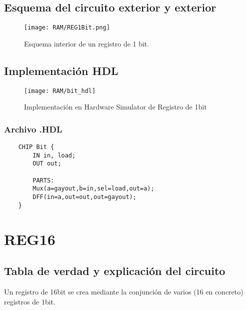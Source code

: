 \documentclass[12pt]{article}
\begin{document}
\subsection{Esquema del circuito exterior y exterior}
\begin{figure}[H]
	\centering
	\texttt{[image: RAM/REG1Bit.png]}
	\caption{Esquema interior de un registro de 1 bit.}
	\label{fig:reg1bit}
\end{figure}
\subsection{Implementación HDL}
\begin{figure}[H]
	\centering
	\texttt{[image: RAM/bit\_hdl]}
	\caption{Implementación en Hardware Simulator de Registro de 1bit}
	\label{fig:bithdl}
\end{figure}
\subsubsection{Archivo .HDL}
\begin{lstlisting}
	CHIP Bit {
		IN in, load;
		OUT out;

		PARTS:
		Mux(a=gayout,b=in,sel=load,out=a);
		DFF(in=a,out=out,out=gayout);
	}
\end{lstlisting}

\newpage
\section{REG16}
\subsection{Tabla de verdad y explicación del circuito}
Un registro de 16bit se crea mediante la conjunción de varios (16 en concreto) registros de 1bit.
\end{document}
